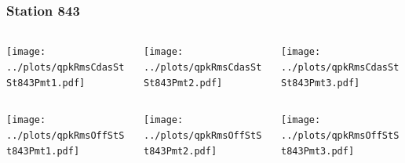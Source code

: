 \documentclass[aspectratio=169]{beamer}
\begin{document}
\begin{frame} 
  \frametitle{Station 843}
  \begin{center}
    \begin{columns}
      \begin{column}{0.33\textwidth}
        \texttt{[image: ../plots/qpkRmsCdasStSt843Pmt1.pdf]}
      \end{column}
      \begin{column}{0.33\textwidth}
        \texttt{[image: ../plots/qpkRmsCdasStSt843Pmt2.pdf]}
      \end{column}
      \begin{column}{0.33\textwidth}
        \texttt{[image: ../plots/qpkRmsCdasStSt843Pmt3.pdf]}
      \end{column}
    \end{columns}
  \end{center}

  \begin{center}
    \begin{columns}
      \begin{column}{0.33\textwidth}
        \texttt{[image: ../plots/qpkRmsOffStSt843Pmt1.pdf]}
      \end{column}
      \begin{column}{0.33\textwidth}
        \texttt{[image: ../plots/qpkRmsOffStSt843Pmt2.pdf]}
      \end{column}
      \begin{column}{0.33\textwidth}
        \texttt{[image: ../plots/qpkRmsOffStSt843Pmt3.pdf]}
      \end{column}
    \end{columns}
  \end{center}
\end{frame}
\end{document}
